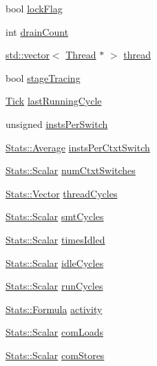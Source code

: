 \begin{DoxyCompactItemize}
bool \hyperlink{classInOrderCPU_aa062c7f3423632ca66107fdbb9d38131}{lockFlag}
\item 
int \hyperlink{classInOrderCPU_a91cd9b9d8a8f3793796b9eff33e0ffeb}{drainCount}
\item 
\hyperlink{classstd_1_1vector}{std::vector}$<$ \hyperlink{classInOrderThreadState}{Thread} $\ast$ $>$ \hyperlink{classInOrderCPU_afe9da004c5a3f37cbb72fa3763d4c0d1}{thread}
\item 
bool \hyperlink{classInOrderCPU_a202139c46c2d06ae2263b4d3bfc27f1a}{stageTracing}
\item 
\hyperlink{base_2types_8hh_a5c8ed81b7d238c9083e1037ba6d61643}{Tick} \hyperlink{classInOrderCPU_a55a1507086425a12c25953d6061af80c}{lastRunningCycle}
\item 
unsigned \hyperlink{classInOrderCPU_aa5fa9dd1c64f901b65487ef9c44ba4c1}{instsPerSwitch}
\item 
\hyperlink{classStats_1_1Average}{Stats::Average} \hyperlink{classInOrderCPU_a057e08ddcb9e612ce7e273a324fd2a31}{instsPerCtxtSwitch}
\item 
\hyperlink{classStats_1_1Scalar}{Stats::Scalar} \hyperlink{classInOrderCPU_aa26707fae717bb36afa9b658f895d8d2}{numCtxtSwitches}
\item 
\hyperlink{classStats_1_1Vector}{Stats::Vector} \hyperlink{classInOrderCPU_a102b6d2d89b9006b8ac3bd3fe69284f0}{threadCycles}
\item 
\hyperlink{classStats_1_1Scalar}{Stats::Scalar} \hyperlink{classInOrderCPU_a1ad677a4636a45f2352c8e0e7b2e3b05}{smtCycles}
\item 
\hyperlink{classStats_1_1Scalar}{Stats::Scalar} \hyperlink{classInOrderCPU_a174dbfb3c7b892914a54cec44ed2eeaf}{timesIdled}
\item 
\hyperlink{classStats_1_1Scalar}{Stats::Scalar} \hyperlink{classInOrderCPU_a42e0f4c18fdb8ef7504f5c45d697fb14}{idleCycles}
\item 
\hyperlink{classStats_1_1Scalar}{Stats::Scalar} \hyperlink{classInOrderCPU_af9addd340a133c2f4add363a3055b019}{runCycles}
\item 
\hyperlink{classStats_1_1Formula}{Stats::Formula} \hyperlink{classInOrderCPU_acaf6f85dd1ae8aa79c075d446098f5b1}{activity}
\item 
\hyperlink{classStats_1_1Scalar}{Stats::Scalar} \hyperlink{classInOrderCPU_ad1256d43890e80b4ef9d1d6fd2ee2286}{comLoads}
\item 
\hyperlink{classStats_1_1Scalar}{Stats::Scalar} \hyperlink{classInOrderCPU_a371b0215b84c06c3ec41dccbe2a7988b}{comStores}
\item 

\end{DoxyCompactItemize}
